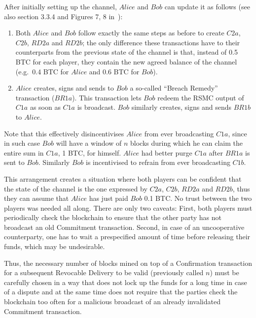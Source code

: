     After initially setting up the channel, $Alice$ and $Bob$ can update it as follows
    (see also section 3.3.4 and Figures 7, 8 in~\cite{lightning}):
    \begin{enumerate}
      \item Both $Alice$ and $Bob$ follow exactly the same steps as before to create
      $C2a$, $C2b$, $RD2a$ and $RD2b$; the only difference these transactions have to
      their counterparts from the previous state of the channel is that, instead of 0.5
      BTC for each player, they contain the new agreed balance of the channel
      (e.g.\ 0.4
      BTC for $Alice$ and 0.6 BTC for $Bob$).

      \item $Alice$ creates, signs and sends to $Bob$ a so-called ``Breach Remedy''
      transaction ($BR1a$). This transaction lets $Bob$ redeem the RSMC output of $C1a$ as
      soon as $C1a$ is broadcast. $Bob$ similarly creates, signs and sends $BR1b$ to
      $Alice$.
    \end{enumerate}
    Note that this effectively disincentivises $Alice$ from ever broadcasting $C1a$, since
    in such case $Bob$ will have a window of $n$ blocks during which he can claim the
    entire sum in $C1a$, 1 BTC, for himself. $Alice$ had better purge $C1a$ after $BR1a$
    is sent to $Bob$. Similarly $Bob$ is incentivised to refrain from ever broadcasting
    $C1b$.

    This arrangement creates a situation where both players can be confident that the
    state of the channel is the one expressed by $C2a$, $C2b$, $RD2a$ and $RD2b$, thus
    they can assume that $Alice$ has just paid $Bob$ 0.1 BTC. No trust between the two
    players was needed all along. There are only two caveats: First, both players must
    periodically check the blockchain to ensure that the other party has not broadcast an
    old Commitment transaction. Second, in case of an uncooperative counterparty, one has
    to wait a prespecified amount of time before releasing their funds, which may be
    undesirable.

    Thus, the necessary number of blocks mined on top of a Confirmation transaction for a
    subsequent Revocable Delivery to be valid (previously called $n$) must be carefully
    chosen in a way that does not lock up the funds for a long time in case of a dispute
    and at the same time does not require that the parties check the blockchain too often
    for a malicious broadcast of an already invalidated Commitment transaction.

